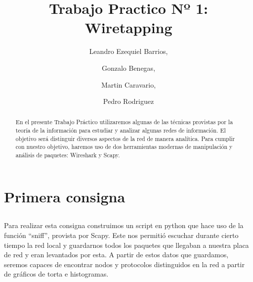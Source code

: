 \documentclass[final,narroweqnarray,inline]{ieee}
\begin{document}
\title[Trabajo Practico Nº 1: Wiretapping]{%
       Trabajo Practico Nº 1: Wiretapping}

\author[SHORT NAMES]{%
	Leandro Ezequiel Barrios,
	\and
	Gonzalo Benegas,
	\and
	Martin Caravario, 
	\and
	Pedro Rodriguez 
}

\maketitle               

\begin{abstract}
En el presente Trabajo Práctico utilizaremos algunas de las técnicas
provistas por la teoría de la información para estudiar y analizar algunas
redes de información. El objetivo será distinguir diversos aspectos de la
red de manera analítica. Para cumplir con nuestro objetivo, haremos uso de
dos herramientas modernas de manipulación y análisis de paquetes: Wireshark
y Scapy.
\end{abstract}

\section{Primera consigna}

\subsection{}
Para realizar esta consigna construimos un script en python que hace uso de la
función ``sniff'', provista por Scapy. Este nos permitió escuchar durante
cierto tiempo la red local y guardarnos todos los paquetes que llegaban a
nuestra placa de red y eran levantados por esta. A partir de estos datos
que guardamos, seremos capaces de encontrar  nodos y protocolos
distinguidos en la red a partir de gráficos de torta e histogramas.
\end{document}
